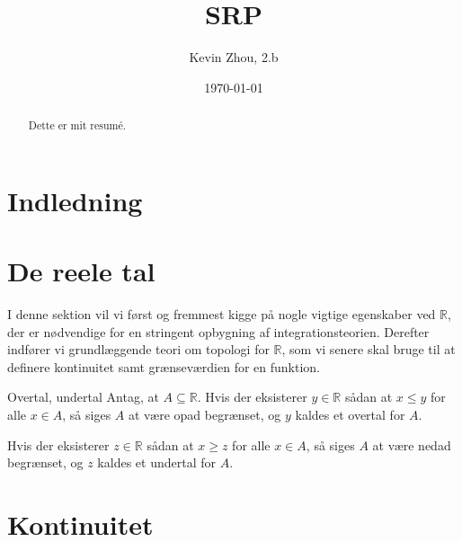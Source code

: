 \documentclass{article}
\title{SRP}
\author{Kevin Zhou, 2.b}
\date{\today}
\begin{document}

\begin{abstract}
  Dette er mit resumé.
\end{abstract}

\tableofcontents
\thispagestyle{empty}
\newpage
\section{Indledning}
  \label{sec:Indledning}

\section{De reele tal}%
\label{sec:De reele tal}

I denne sektion vil vi først og fremmest kigge på nogle vigtige egenskaber ved $\mathbb{R}$, der er nødvendige for en stringent opbygning af integrationsteorien.
Derefter indfører vi grundlæggende teori om topologi for $\mathbb{R}$, som vi senere skal bruge til at definere kontinuitet samt grænseværdien for en funktion.
\begin{definition}{Overtal, undertal}{}
  Antag, at $A \subseteq \mathbb{R}$. 
  Hvis der eksisterer $y \in \mathbb{R}$ sådan at $x \leq y$ for alle $x \in A$, så siges $A$ at være opad begrænset, og $y$ kaldes et overtal for $A$. 

  Hvis der eksisterer $z \in \mathbb{R}$ sådan at $x \geq z$ for alle $x \in A$, så siges $A$ at være nedad begrænset, og $z$ kaldes et undertal for $A$. 
\end{definition}


\section{Kontinuitet}%
\label{sec:Kontinuitet}
\end{document}
